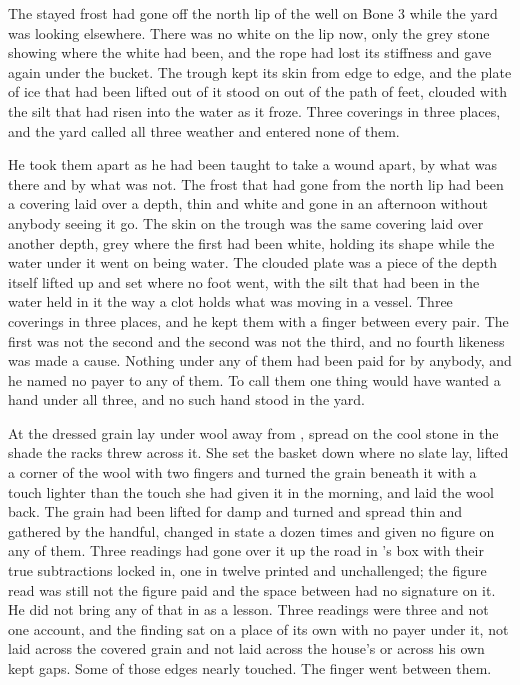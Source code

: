 The stayed frost had gone off the north lip of the well on Bone 3 while the yard was looking elsewhere. There was no white on the lip now, only the grey stone showing where the white had been, and the rope had lost its stiffness and gave again under the bucket. The trough kept its skin from edge to edge, and the plate of ice that had been lifted out of it stood on  out of the path of feet, clouded with the silt that had risen into the water as it froze. Three coverings in three places, and the yard called all three weather and entered none of them.

He took them apart as he had been taught to take a wound apart, by what was there and by what was not. The frost that had gone from the north lip had been a covering laid over a depth, thin and white and gone in an afternoon without anybody seeing it go. The skin on the trough was the same covering laid over another depth, grey where the first had been white, holding its shape while the water under it went on being water. The clouded plate was a piece of the depth itself lifted up and set where no foot went, with the silt that had been in the water held in it the way a clot holds what was moving in a vessel. Three coverings in three places, and he kept them with a finger between every pair. The first was not the second and the second was not the third, and no fourth likeness was made a cause. Nothing under any of them had been paid for by anybody, and he named no payer to any of them. To call them one thing would have wanted a hand under all three, and no such hand stood in the yard.

At  the dressed grain lay under wool away from , spread on the cool stone in the shade the racks threw across it. She set the basket down where no slate lay, lifted a corner of the wool with two fingers and turned the grain beneath it with a touch lighter than the touch she had given it in the morning, and laid the wool back. The grain had been lifted for damp and turned and spread thin and gathered by the handful, changed in state a dozen times and given no figure on any of them. Three readings had gone over it up the road in 's box with their true subtractions locked in, one in twelve printed and unchallenged; the figure read was still not the figure paid and the space between had no signature on it. He did not bring any of that in as a lesson. Three readings were three and not one account, and the finding sat on a place of its own with no payer under it, not laid across the covered grain and not laid across the house's  or across his own kept gaps. Some of those edges nearly touched. The finger went between them.

